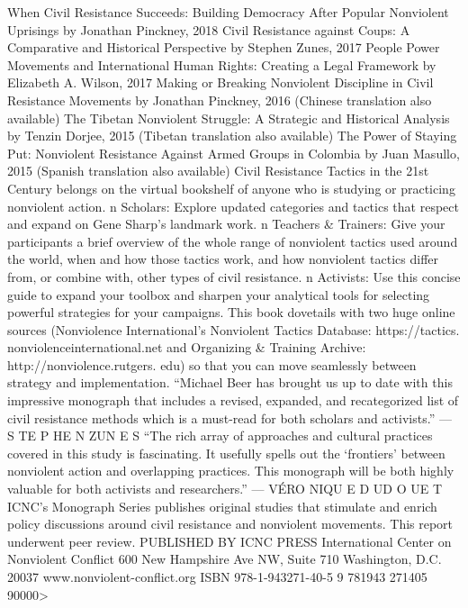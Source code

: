 \documentclass[twoside,a4paper,12pt,fleqn,openany]{extbook}
\begin{document}
When Civil Resistance Succeeds: Building Democracy
After Popular Nonviolent Uprisings
by Jonathan Pinckney, 2018
Civil Resistance against Coups: A Comparative
and Historical Perspective
by Stephen Zunes, 2017
People Power Movements and International Human Rights:
Creating a Legal Framework
by Elizabeth A. Wilson, 2017
Making or Breaking Nonviolent Discipline in Civil Resistance Movements
by Jonathan Pinckney, 2016
(Chinese translation also available)
The Tibetan Nonviolent Struggle: A Strategic and Historical Analysis
by Tenzin Dorjee, 2015
(Tibetan translation also available)
The Power of Staying Put: Nonviolent Resistance
Against Armed Groups in Colombia
by Juan Masullo, 2015
(Spanish translation also available)
Civil Resistance Tactics in the 21st Century belongs on the virtual bookshelf
of anyone who is studying or practicing nonviolent action.
n Scholars: Explore updated categories and
tactics that respect and expand on Gene
Sharp's landmark work.
n Teachers & Trainers: Give your participants
a brief overview of the whole range of
nonviolent tactics used around the world,
when and how those tactics work, and how
nonviolent tactics differ from, or combine
with, other types of civil resistance.
n Activists: Use this concise guide to expand
your toolbox and sharpen your analytical
tools for selecting powerful strategies for
your campaigns.
This book dovetails with two huge online
sources (Nonviolence International’s
Nonviolent Tactics Database: https://tactics.
nonviolenceinternational.net and Organizing &
Training Archive: http://nonviolence.rutgers.
edu) so that you can move seamlessly between
strategy and implementation.
“Michael Beer has brought us up to date with this impressive
monograph that includes a revised, expanded, and recategorized
list of civil resistance methods which is a must-read for both
scholars and activists.” — S TE P HE N ZUN E S
“The rich array of approaches and cultural practices covered in
this study is fascinating. It usefully spells out the ‘frontiers’ between
nonviolent action and overlapping practices. This monograph
will be both highly valuable for both activists and researchers.”
— VÉRO NIQU E D UD O UE T
ICNC’s Monograph Series publishes original studies
that stimulate and enrich policy discussions around
civil resistance and nonviolent movements.
This report underwent peer review.
PUBLISHED BY ICNC PRESS
International Center on Nonviolent Conflict
600 New Hampshire Ave NW, Suite 710
Washington, D.C. 20037
www.nonviolent-conflict.org
ISBN 978-1-943271-40-5
9 781943 271405
90000>
\end{document}

